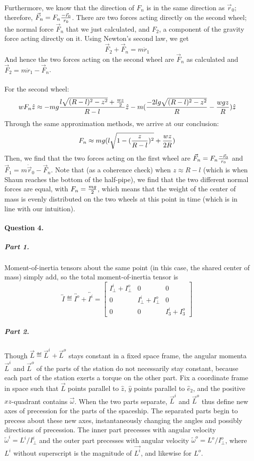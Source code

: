 Furthermore, we know that the direction of $F_n$ is in the same direction as $\vec r_0$; therefore, $\vec F_n=F_n\frac{-\vec r_0}{r_0}$.  There are two forces acting directly on the second wheel; the normal force $\vec F_n$ that we just calculated, and $F_2$, a component of the gravity force acting directly on it.  Using Newton's second law, we get
$$\vec F_2+\vec F_n=m \ddot r_1$$
And hence the two forces acting on the second wheel are $\vec F_n$ as calculated and $\vec F_2=m\ddot r_1-\vec F_n$.
\\\\ For the second wheel:
$$w F_n \hat z\approx -mg\frac{l\sqrt{(R-l)^2-z^2}+\frac {wz}2}{R-l} \hat z-m(\frac{-2lg\sqrt{(R-l)^2-z^2}}{R}-\frac {wgz}R)\hat z$$
Through the same approximation methods, we arrive at our conclusion:
$$F_n \approx mg(l\sqrt{1-(\frac z {R-l})^2}+\frac{wz}{2R})$$
Then, we find that the two forces acting on the first wheel are $\vec F_n=F_n \frac{-\vec r_0}{r_0}$ and $\vec F_1=m\ddot{\vec r}_0-\vec F_n$.  Note that (as a coherence check) when $z\approx R-l$ (which is when Shaun reaches the bottom of the half-pipe), we find that the two different normal forces are equal, with $F_n=\frac {mg}2$, which means that the weight of the center of mass is evenly distributed on the two wheels at this point in time (which is in line with our intuition).  

\paragraph{Question 4.}

\subparagraph{Part 1.}  Moment-of-inertia tensors about the same point (in this case, the shared center of mass) simply add, so the total moment-of-inertia tensor is $$\overleftrightarrow{I}
\eqdef \overleftrightarrow{I^o} + \overleftrightarrow{I^i} =
\begin{bmatrix}
I_\bot^i + I_\bot^o & 0 & 0 \\
0 & I_\bot^i + I_\bot^o & 0 \\
0 & 0 & I_3^i + I_3^o
\end{bmatrix}$$

\subparagraph{Part 2.}

Though $\vec{L} \eqdef \vec{L}^i + \vec{L}^o$ stays constant in a fixed space frame, the angular momenta $\vec{L}^i$ and $\vec{L}^o$ of the parts of the station do not necessarily stay constant, because each part of the station exerts a torque on the other part.  Fix a coordinate frame in space such that $\vec{L}$ points parallel to $\hat{z}$, $\hat{y}$ points parallel to $\hat{e}_2$, and the positive $xz$-quadrant contains $\vec{\omega}$. When the two parts separate, $\vec{L}^i$ and $\vec{L}^o$ thus define new axes of precession for the parts of the spaceship.  The separated parts begin to precess about these new axes, instantaneously changing the angles and possibly directions of precession.  The inner part precesses with angular velocity $\tilde{\omega}^i = L^i/I_\bot^i$ and the outer part precesses with angular velocity $\tilde{\omega}^o = L^o/I_{\bot}^o$, where $L^i$ without superscript is the magnitude of $\vec{L^i}$, and likewise for $L^o$.

